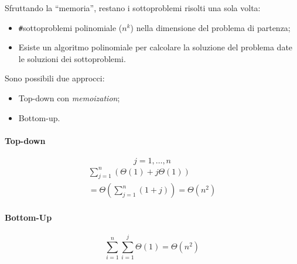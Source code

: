 Sfruttando la ``memoria'', restano i sottoproblemi risolti una sola volta:
\begin{center}
\end{center}

\begin{itemize}
    \item \verb|#|sottoproblemi polinomiale ($n^k$) nella dimensione del problema di partenza;
    \item Esiste un algoritmo polinomiale per calcolare la soluzione del problema date le soluzioni dei sottoproblemi.
\end{itemize}

Sono possibili due approcci: 
\begin{itemize}
    \item Top-down con \emph{memoization};
    \item Bottom-up.
\end{itemize}

\paragraph{Top-down}



$$j = 1, \dots, n$$
\begin{gather*}
    \displaystyle\sum_{j=1}^{n} \left( \Theta(1) + j \Theta(1) \right) \\
    = \Theta \left( \displaystyle\sum_{j=1}^{n} (1+j) \right) = \Theta(n^2)
\end{gather*}

\paragraph{Bottom-Up}


$$\displaystyle\sum_{i=1}^n \displaystyle\sum_{i=1}^j \Theta(1) = \Theta (n^2)$$
